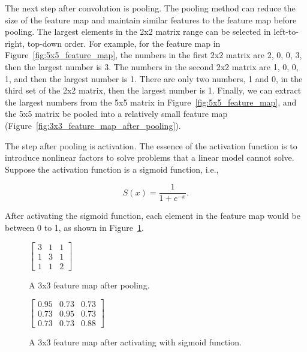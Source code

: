 The next step after convolution is pooling. The pooling method can reduce the size of the feature map and maintain similar features to the feature map before pooling. The largest elements in the 2x2 matrix range can be selected in left-to-right, top-down order. For example, for the feature map in Figure~\ref{fig:5x5_feature_map}, the numbers in the first 2x2 matrix are 2, 0, 0, 3, then the largest number is 3. The numbers in the second 2x2 matrix are 1, 0, 0, 1, and then the largest number is 1. There are only two numbers, 1 and 0, in the third set of the 2x2 matrix, then the largest number is 1. Finally, we can extract the largest numbers from the 5x5 matrix in Figure~\ref{fig:5x5_feature_map}, and the 5x5 matrix be pooled into a relatively small feature map (Figure~\ref{fig:3x3_feature_map_after_pooling}).


The step after pooling is activation. The essence of the activation function is to introduce nonlinear factors to solve problems that a linear model cannot solve. Suppose the activation function is a sigmoid function, i.e.,

\begin{equation}
    S(x) =  \frac{\mathrm{1} }{\mathrm{1} + e^{-x} }.
\end{equation}



After activating the sigmoid function, each element in the feature map would be between 0 to 1, as shown in Figure~\ref{fig:3x3_feature_map_after_activating}.

\begin{figure}[h]
  \centering
  \begin{minipage}[b]{0.4\textwidth}
    \centering
    $\begin{bmatrix}
    3 & 1 & 1\\
    1 & 3 & 1\\
    1 & 1 & 2
    \end{bmatrix}$
    \caption{A 3x3 feature map after pooling.}
    \label{fig:3x3_feature_map_after_pooling}
  \end{minipage}
  \hfill
  \begin{minipage}[b]{0.4\textwidth}
    \centering
    $\begin{bmatrix}
    0.95 & 0.73 & 0.73\\
    0.73 & 0.95 & 0.73\\
    0.73 & 0.73 & 0.88
    \end{bmatrix}$
    \caption{A 3x3 feature map after activating with sigmoid function.}
    \label{fig:3x3_feature_map_after_activating}
  \end{minipage}
\end{figure}

